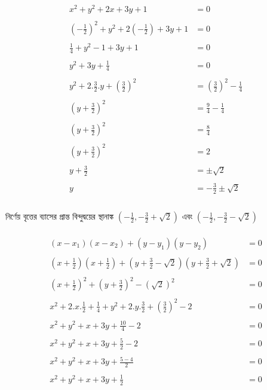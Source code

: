 \documentclass{article}
\begin{document}
\begin{align*}
x^2+y^2+2x+3y+1&=0\\
\\
\left(-\frac{1}{2}\right)^2+y^2+2\left(-\frac{1}{2}\right)+3y+1&=0\\
\\
\frac{1}{4}+y^2-1+3y+1&=0\\
\\
y^2+3y+\frac{1}{4}&=0\\
\\
y^2+2.\frac{3}{2}.y+\left(\frac{3}{2}\right)^2&=\left(\frac{3}{2}\right)^2-\frac{1}{4}\\
\\
\left(y+\frac{3}{2}\right)^2&=\frac{9}{4}-\frac{1}{4}\\
\\
\left(y+\frac{3}{2}\right)^2&=\frac{8}{4}\\
\\
\left(y+\frac{3}{2}\right)^2&=2\\
\\
y+\frac{3}{2}&=\pm \sqrt{2}\\
\\
y&=-\frac{3}{2}\pm\sqrt{2}\\
\end{align*}
\\ 
নির্ণেয় বৃত্তের ব্যাসের প্রান্ত বিন্দুদ্বয়ের স্থানাঙ্ক $\left(-\frac{1}{2},-\frac{3}{2}+\sqrt{2}\right)$ এবং $\left(-\frac{1}{2},-\frac{3}{2}-\sqrt{2}\right)$\\
\\
\begin{align*}
(x-x_1)(x-x_2)+(y-y_1)(y-y_2)&=0\\
\\
\left(x+\frac{1}{2}\right) \left(x+\frac{1}{2}\right)+\left(y+\frac{3}{2}-\sqrt{2}\right)\left(y+\frac{3}{2}+\sqrt{2}\right)&=0\\
\\
\left(x+\frac{1}{2}\right)^2+\left(y+\frac{3}{2}\right)^2-(\sqrt{2})^2&=0\\
\\
x^2+2.x.\frac{1}{2}+\frac{1}{4}+y^2+2.y.\frac{3}{2}+\left(\frac{3}{2}\right)^2-2&=0\\
\\
x^2+y^2+x+3y+\frac{10}{4}-2&=0\\
\\
x^2+y^2+x+3y+\frac{5}{2}-2&=0\\
\\
x^2+y^2+x+3y+\frac{5-4}{2}&=0\\
\\
x^2+y^2+x+3y+\frac{1}{2}&=0\\
\end{align*}
\end{document}

